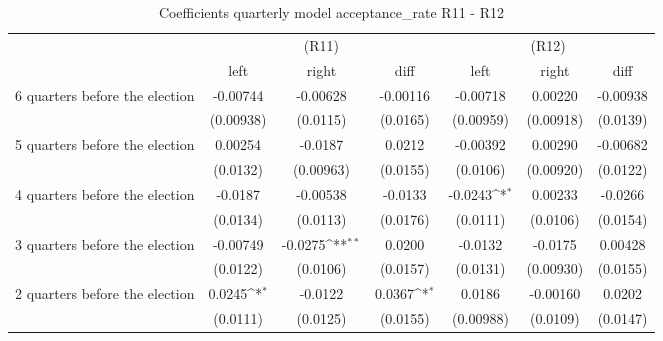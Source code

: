\begin{table}[!ht]\centering \footnotesize
\def\sym#1{\ifmmode^{#1}\else\(^{#1}\)\fi}
\caption{Coefficients quarterly model acceptance\_rate R11 - R12}
\begin{tabular}{l*{6}{c}}
\hline\hline
                    &\multicolumn{3}{c}{(R11)}&\multicolumn{3}{c}{(R12)}\\
&\multicolumn{1}{c}{left}&\multicolumn{1}{c}{right}&\multicolumn{1}{c}{diff}&\multicolumn{1}{c}{left}&\multicolumn{1}{c}{right}&\multicolumn{1}{c}{diff}\\
\hline
 6 quarters before the election&    -0.00744         &    -0.00628         &    -0.00116         &    -0.00718         &     0.00220         &    -0.00938         \\
                    &   (0.00938)         &    (0.0115)         &    (0.0165)         &   (0.00959)         &   (0.00918)         &    (0.0139)         \\
[0,5em]
 5 quarters before the election&     0.00254         &     -0.0187         &      0.0212         &    -0.00392         &     0.00290         &    -0.00682         \\
                    &    (0.0132)         &   (0.00963)         &    (0.0155)         &    (0.0106)         &   (0.00920)         &    (0.0122)         \\
[0,5em]
 4 quarters before the election&     -0.0187         &    -0.00538         &     -0.0133         &     -0.0243\sym{*}  &     0.00233         &     -0.0266         \\
                    &    (0.0134)         &    (0.0113)         &    (0.0176)         &    (0.0111)         &    (0.0106)         &    (0.0154)         \\
[0,5em]
 3 quarters before the election&    -0.00749         &     -0.0275\sym{**} &      0.0200         &     -0.0132         &     -0.0175         &     0.00428         \\
                    &    (0.0122)         &    (0.0106)         &    (0.0157)         &    (0.0131)         &   (0.00930)         &    (0.0155)         \\
[0,5em]
 2 quarters before the election&      0.0245\sym{*}  &     -0.0122         &      0.0367\sym{*}  &      0.0186         &    -0.00160         &      0.0202         \\
                    &    (0.0111)         &    (0.0125)         &    (0.0155)         &   (0.00988)         &    (0.0109)         &    (0.0147)         \\

\end{tabular}
\end{table}
